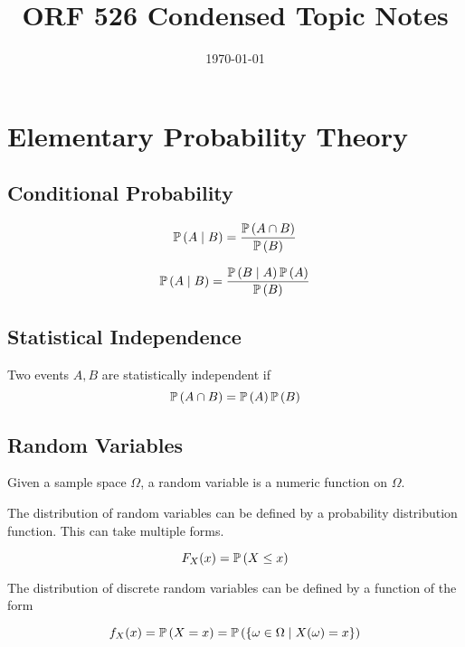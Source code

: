 \documentclass[12pt, titlepage]{article}
\title{ORF 526 Condensed Topic Notes}
\date{\today}
\begin{document}
\maketitle
\tableofcontents
\newpage

\section{Elementary Probability Theory}

\subsection{Conditional Probability}

\begin{dfn}{}
\[\mathbb{P}\left(A \mid B\right) = \frac{\mathbb{P}\left(A \cap B\right)}{\mathbb{P}\left(B\right)}\]
\end{dfn}

\begin{theo}{}
\[\mathbb{P}\left(A \mid B\right) = \frac{\mathbb{P}\left(B \mid A\right) \mathbb{P}\left(A\right)}{\mathbb{P}\left(B\right)}\]
\end{theo}
\subsection{Statistical Independence}

\begin{dfn}{}
Two events $A, B$ are statistically independent if
\[\mathbb{P}\left(A \cap B\right) = \mathbb{P}\left(A\right) \mathbb{P}\left(B\right)\]
\end{dfn}


\subsection{Random Variables}

\begin{dfn}{}
Given a sample space $\Omega$, a random variable is a numeric function on $\Omega$.
\end{dfn}

The distribution of random variables can be defined by a probability distribution function. This can take multiple forms.

\begin{dfn}{}
\[F_X(x) = \mathbb{P}\left(X \leq x\right)\]
\end{dfn}

\begin{dfn}{}
The distribution of discrete random variables can be defined by a function of the form

\[f_X(x) = \mathbb{P}\left(X = x\right) = \mathbb{P}\left(\{\omega \in \Omega \mid X(\omega) = x\}\right)\]
\end{dfn}
\end{document}
